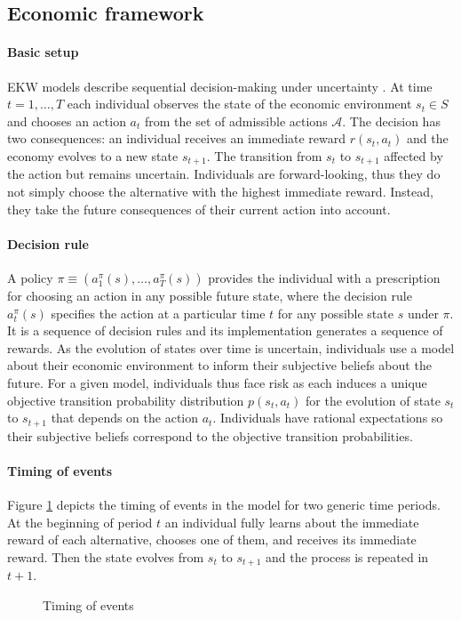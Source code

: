 \subsection{Economic framework}
\paragraph{Basic setup} EKW models describe sequential decision-making under uncertainty \citep{Machina.2014,Gilboa.2009}. At time $t = 1, \hdots, T$ each individual observes the state of the economic environment $s_t\in S$ and chooses an action $a_t$ from the set of admissible actions $\mathcal{A}$. The decision has two consequences: an individual receives an immediate reward $r(s_t, a_t)$ and the economy evolves to a new state $s_{t + 1}$. The transition from $s_t$ to $s_{t + 1}$ affected by the action but remains uncertain. Individuals are forward-looking, thus they do not simply choose the alternative with the highest immediate reward. Instead, they take the future consequences of their current action into account.

\paragraph{Decision rule} A policy $\pi \equiv(a^\pi_1(s), \hdots, a^\pi_T(s))$ provides the individual with a prescription for choosing an action in any possible future state, where the decision rule $a^\pi_t(s)$ specifies the action at a particular time $t$ for any possible state $s$ under $\pi$. It is a sequence of decision rules and its implementation generates a sequence of rewards.  As the evolution of states over time is uncertain, individuals use a model about their economic environment to inform their subjective beliefs about the future. For a given model, individuals thus face risk as each induces a unique objective transition probability distribution $p(s_t, a_t)$ for the evolution of state $s_t$ to $s_{t + 1}$ that depends on the action $a_t$. Individuals have rational expectations \citep{Muth.1961,Lucas.1972} so their subjective beliefs correspond to the objective transition probabilities.

\paragraph{Timing of events} Figure \ref{Timing} depicts the timing of events in the model for two generic time periods. At the beginning of period $t$ an individual fully learns about the immediate reward of each alternative, chooses one of them, and receives its immediate reward. Then the state evolves from $s_t$ to $s_{t + 1}$ and the process is repeated in $t + 1$.
%
\begin{figure}\caption{Timing of events}\label{Timing}\vspace{1.0cm}\centering

\end{figure}
%
